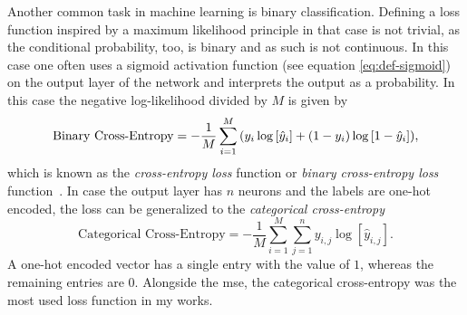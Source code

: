 Another common task in machine learning is binary classification. Defining a loss function inspired by a maximum likelihood principle in that case is not trivial, as the conditional probability, too, is binary and as such is not continuous. In this case one often uses a sigmoid activation function (see equation \eqref{eq:def-sigmoid}) on the output layer of the network and interprets the output as a probability. In this case the negative log-likelihood divided by $M$ is given by~\cite{Goodfellow:2016:DNN}%
\begin{equation}
\text{Binary Cross-Entropy} = - \frac{1}{M} \sum_{i=1}^M {\left( y_i\log\left[\hat{y}_i\right]+{\left( 1 - y_i \right)}\log\left[1 - \hat{y}_i\right] \right)},
\end{equation}
which is known as the \emph{cross-entropy loss} function or \emph{binary cross-entropy loss} function~\cite{Geron:2017aaa}. %
In case the output layer has $n$ neurons and the labels are one-hot encoded, the loss can be generalized to the \emph{categorical cross-entropy}
\begin{equation}
\text{Categorical Cross-Entropy} = - \frac{1}{M} \sum_{i=1}^M \sum_{j=1}^n y_{i, j}\log\left[\hat{y}_{i, j}\right].
\end{equation}
A one-hot encoded vector has a single entry with the value of $1$, whereas the remaining entries are $0$. Alongside the \acrshort{mse}, the categorical cross-entropy was the most used loss function in my works.

